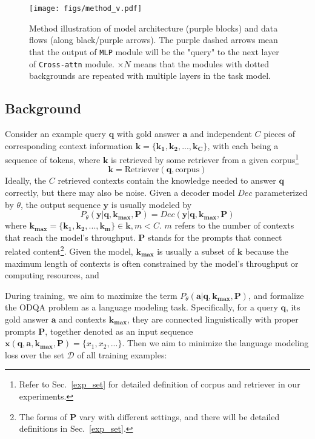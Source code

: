 \begin{figure}[tb]
\centering
\texttt{[image: figs/method\_v.pdf]}
\caption{Method illustration of model architecture (purple blocks) and data flows (along black/purple arrows). The purple dashed arrows mean that the output of \texttt{MLP} module will be the "query" to the next layer of \texttt{Cross-attn} module. $\times N$ means that the modules with dotted backgrounds are repeated with multiple layers in the task model.}
\label{method_fig}
\end{figure}

\subsection{Background}

Consider an example query $\bm{q}$ with gold answer $\bm{a}$ and independent $C$ pieces of corresponding context information $\bm{k} = \{\bm{k_1}, \bm{k_2}, ..., \bm{k_C}\}$, with each being a sequence of tokens, where $\bm{k}$ is retrieved by some retriever from a given corpus\footnote{Refer to Sec.~\ref{exp_set} for detailed definition of corpus and retriever in our experiments.}
$$\bm{k} = \text{Retriever}(\bm{q}, \text{corpus})$$
Ideally, the $C$ retrieved contexts contain the knowledge needed to answer $\bm{q}$ correctly, but there may also be noise. Given a decoder model $Dec$ parameterized by $\theta$, the output sequence $\bm{y}$ is usually modeled by
$$P_\theta(\bm{y} | \bm{q}, \bm{k_{max}}, \bm{P}) = Dec(\bm{y} | \bm{q}, \bm{k_{max}}, \bm{P})$$
where $\bm{k_{max}} = \{\bm{k_1}, \bm{k_2}, ..., \bm{k_m}\} \in \bm{k}, m < C$. $m$ refers to the number of contexts that reach the model's throughput. $\bm{P}$ stands for the prompts that connect related content\footnote{The forms of $\bm{P}$ vary with different settings, and there will be detailed definitions in Sec.~\ref{exp_set}.}. Given the model, $\bm{k_{max}}$ is usually a subset of $\bm{k}$ because the maximum length of contexts is often constrained by the model's throughput or computing resources, and  

During training, we aim to maximize the term $P_\theta(\bm{a} | \bm{q}, \bm{k_{max}}, \bm{P})$, and formalize the ODQA problem as a language modeling task. Specifically, for a query $\bm{q}$, its gold answer $\bm{a}$ and contexts $\bm{k_{max}}$, they are connected linguistically with proper prompts $\bm{P}$, together denoted as an input sequence $\bm{x}(\bm{q}, \bm{a}, \bm{k_{max}}, \bm{P}) = \{x_1,x_2, ...\}$. Then we aim to minimize the language modeling loss over the set $\mathcal{D}$ of all training examples:

